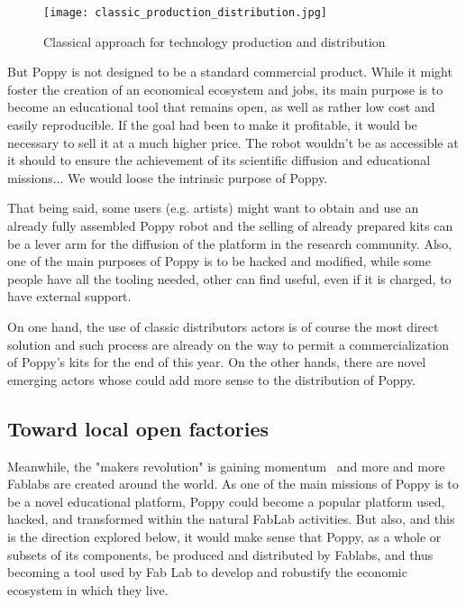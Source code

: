 \begin{figure}[ht]
    \begin{center}
        \texttt{[image: classic\_production\_distribution.jpg]}
    \end{center}
    \caption{Classical approach for technology production and distribution}
    \label{fig:classic}
\end{figure}

But Poppy is not designed to be a standard commercial product. While it might foster the creation of an economical ecosystem and jobs, its main purpose is to become an educational tool that remains open, as well as rather low cost and easily reproducible. If the goal had been to make it profitable, it would be necessary to sell it at a much higher price. The robot wouldn't be as accessible at it should to ensure the achievement of its scientific diffusion and educational missions... We would loose the intrinsic purpose of Poppy.

That being said, some users (e.g. artists) might want to obtain and use an already fully assembled Poppy robot and the selling of already prepared kits can be a lever arm for the diffusion of the platform in the research community.
Also, one of the main purposes of Poppy is to be hacked and modified, while some people have all the tooling needed, other can find useful, even if it is charged, to have external support.

On one hand, the use of classic distributors actors is of course the most direct solution and such process are already on the way to permit a commercialization of Poppy's kits for the end of this year. On the other hands, there are novel emerging actors whose could add more sense to the distribution of Poppy.


\subsection{Toward local open factories} %

Meanwhile, the "makers revolution" is gaining momentum~\parencite{anderson2012makers} and more and more Fablabs are created around the world. As one of the main missions of Poppy is to be a novel educational platform, Poppy could become a popular platform used, hacked, and transformed within the natural FabLab activities. But also, and this is the direction explored below,  it would make sense that Poppy, as a whole or subsets of its components, be produced and distributed by Fablabs, and thus becoming a tool used by Fab Lab to develop and robustify the economic ecosystem in which they live.

